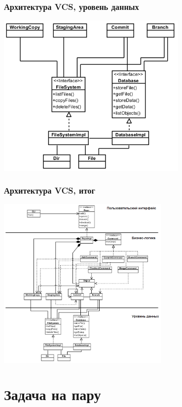 \documentclass[xetex,mathserif,serif]{beamer}
\begin{document}
	\begin{frame}
		\frametitle{Архитектура VCS, уровень данных}
		\begin{center}
			\includegraphics[width=0.7\textwidth]{vcsDataLayer.png}
		\end{center}
	\end{frame}

	\begin{frame}
		\frametitle{Архитектура VCS, итог}
		\begin{center}
			\includegraphics[width=0.63\textwidth]{vcsOverallArchitecture.png}
		\end{center}
	\end{frame}

	\section{Задача на пару}
\end{document}
